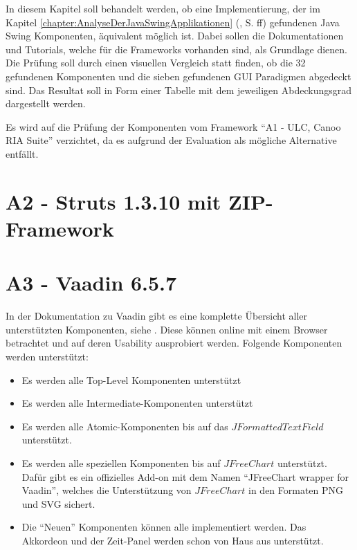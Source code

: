 In diesem Kapitel soll behandelt werden, ob eine Implementierung, der im Kapitel 
\ref{chapter:AnalyseDerJavaSwingApplikationen}
(, S.
\pageref{chapter:AnalyseDerJavaSwingApplikationen}ff) gefundenen Java Swing
Komponenten, äquivalent möglich ist. Dabei sollen die Dokumentationen und
Tutorials, welche für die Frameworks vorhanden sind, als Grundlage dienen. Die
Prüfung soll durch einen visuellen Vergleich statt finden, ob die 32 gefundenen
Komponenten und die sieben gefundenen GUI Paradigmen abgedeckt sind. Das
Resultat soll in Form einer Tabelle mit dem jeweiligen Abdeckungsgrad
dargestellt werden.

Es wird auf die Prüfung der Komponenten vom Framework ``A1 - ULC, Canoo RIA
Suite'' verzichtet, da es aufgrund der Evaluation als mögliche Alternative
entfällt.

\section{A2 - Struts 1.3.10 mit ZIP-Framework}

\section{A3 - Vaadin 6.5.7}

In der Dokumentation zu Vaadin gibt es eine komplette Übersicht aller
unterstützten Komponenten, siehe \cite{VaadinKomponenten}. Diese können online
mit einem Browser betrachtet und auf deren Usability ausprobiert werden.
Folgende Komponenten werden unterstützt:

\begin{itemize}
  \item Es werden alle Top-Level Komponenten unterstützt
  \item Es werden alle Intermediate-Komponenten unterstützt
  \item Es werden alle Atomic-Komponenten bis auf das
  \(JFormattedTextField\) unterstützt.
  \item Es werden alle speziellen Komponenten bis auf
  \(JFreeChart\) unterstützt. Dafür gibt es ein offizielles
  Add-on mit dem Namen ``JFreeChart wrapper for Vaadin'', welches die
  Unterstützung von \(JFreeChart\) in den Formaten PNG und SVG sichert.
  \item Die ``Neuen'' Komponenten können alle implementiert werden. Das
  Akkordeon und der Zeit-Panel werden schon von Haus aus unterstützt.
\end{itemize}

